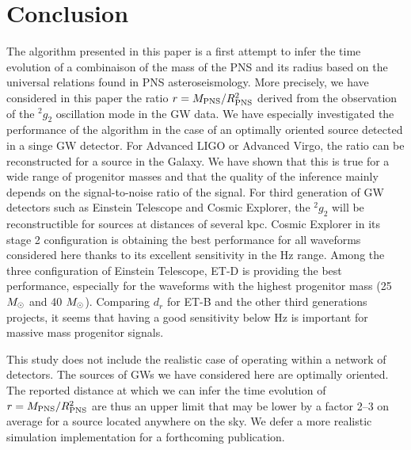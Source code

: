 \section{Conclusion}
\label{sec:conclusion}
The algorithm presented in this paper is a first attempt to infer the time evolution of a
combinaison of the mass of the PNS and its radius based on the universal relations found
in PNS asteroseismology. More precisely, we have considered in this paper the ratio
$r=M_{\rm PNS}/R_{\rm PNS}^2$ derived from the observation of the $\mbox{}^2g_2$
oscillation mode in the GW data. We have especially investigated the performance of the algorithm
in the case of an optimally oriented source detected in a singe GW detector. For Advanced LIGO
or Advanced Virgo, the ratio can be reconstructed for a source in the Galaxy. We have shown
that this is true for a wide range of progenitor masses and that the quality of the inference
mainly depends on the signal-to-noise ratio of the signal. For third generation of GW detectors such
as Einstein Telescope and Cosmic Explorer, the $\mbox{}^2g_2$ will be reconstructible for sources
at distances of several kpc. Cosmic Explorer in its stage 2 configuration is obtaining the best performance
for all waveforms considered here thanks to its excellent sensitivity in the \unit[100-1000]{Hz} range.
Among the three configuration of Einstein Telescope, ET-D is providing the best performance,
especially for the waveforms with the highest progenitor mass (25 $M_{\odot}$ and 40 $M_{\odot}$). Comparing
$d_r$ for ET-B and the other third generations projects, it seems that having a good sensitivity
below \unit[200]{Hz} is important for massive mass progenitor signals.


This study does not include the realistic case of operating within a network of detectors.
The sources of GWs we have considered here are optimally oriented. The reported distance at which
we can infer the time evolution of $r=M_{\rm PNS}/R_{\rm PNS}^2$ are thus an upper limit that may be lower
by a factor 2--3 on average for a source located anywhere on the sky. We defer a more realistic
simulation implementation for a forthcoming publication. 


